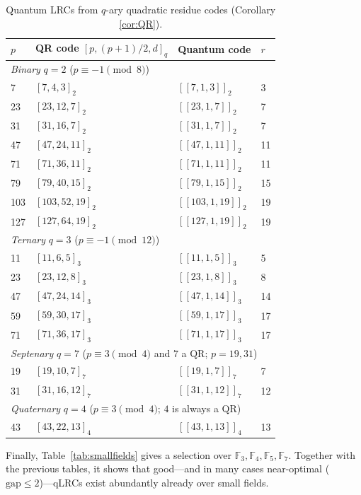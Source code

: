 \documentclass[journal,onecolumn]{IEEEtran}
\newcommand{\Ff}{{\mathbb F}}
\begin{document}
\begin{table}[!htbp]
\caption{Quantum LRCs from $q$-ary quadratic residue codes (Corollary \ref{cor:QR}).}
\label{tab:qr}
\centering
\renewcommand{\arraystretch}{1.15}
\begin{tabular}{llll}
\toprule
$p$ & QR code $[p,(p+1)/2,d]_q$ & Quantum code & $r$ \\
\midrule
\multicolumn{4}{l}{\textit{Binary} $q=2$ ($p\equiv -1 \pmod 8$)} \\
7   & $[7,4,3]_2$    & $[[7,1,3]]_2$    & 3 \\
23  & $[23,12,7]_2$  & $[[23,1,7]]_2$   & 7 \\
31  & $[31,16,7]_2$  & $[[31,1,7]]_2$   & 7 \\
47  & $[47,24,11]_2$ & $[[47,1,11]]_2$  & 11 \\
71  & $[71,36,11]_2$ & $[[71,1,11]]_2$  & 11 \\
79  & $[79,40,15]_2$ & $[[79,1,15]]_2$  & 15 \\
103 & $[103,52,19]_2$& $[[103,1,19]]_2$ & 19 \\
127 & $[127,64,19]_2$& $[[127,1,19]]_2$ & 19 \\
\multicolumn{4}{l}{\textit{Ternary} $q=3$ ($p\equiv -1 \pmod{12}$)} \\
11  & $[11,6,5]_3$   & $[[11,1,5]]_3$   & 5 \\
23  & $[23,12,8]_3$  & $[[23,1,8]]_3$   & 8 \\
47  & $[47,24,14]_3$ & $[[47,1,14]]_3$  & 14 \\
59  & $[59,30,17]_3$ & $[[59,1,17]]_3$  & 17 \\
71  & $[71,36,17]_3$ & $[[71,1,17]]_3$  & 17 \\
\multicolumn{4}{l}{\textit{Septenary} $q=7$ ($p \equiv 3 \pmod 4$ and $7$ a QR; $p=19,31$)} \\
19  & $[19,10,7]_7$  & $[[19,1,7]]_7$   & 7 \\
31  & $[31,16,12]_7$ & $[[31,1,12]]_7$  & 12 \\
\multicolumn{4}{l}{\textit{Quaternary} $q=4$ ($p\equiv 3 \pmod 4$; $4$ is always a QR)} \\
43  & $[43,22,13]_4$ & $[[43,1,13]]_4$ & 13 \\
\bottomrule
\end{tabular}
\end{table}

Finally, Table~\ref{tab:smallfields} gives a selection over $\Ff_3,\Ff_4,\Ff_5,\Ff_7$. Together with the previous tables, it shows that good---and in many cases near-optimal ($\mathrm{gap}\le 2$)---qLRCs exist abundantly already over small fields.
\end{document}
